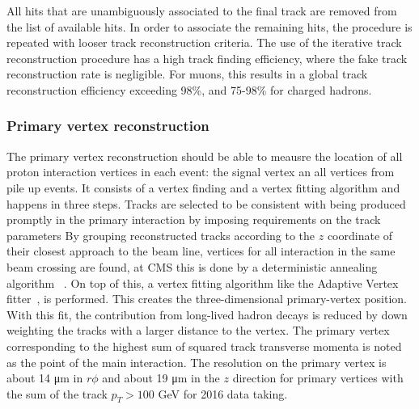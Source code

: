 All hits that are unambiguously associated to the final track are removed from the list of available hits. In order to associate the remaining hits, the procedure is repeated with looser track reconstruction criteria. The use of the iterative track reconstruction procedure has a high track finding efficiency, where the fake track reconstruction rate is negligible. 
For muons, this results in a global track reconstruction efficiency exceeding 98\%, and 75-98\% for charged hadrons. 
\subsubsection*{Primary vertex reconstruction}
The primary vertex reconstruction should be able to meausre the location of all proton interaction vertices in each event: the signal vertex an all vertices from pile up events. 
It consists of a vertex finding and a vertex fitting algorithm and happens in three steps. Tracks are selected  to be consistent with being produced promptly in the primary interaction by imposing requirements on the track parameters\cite{Chatrchyan:1704291} By grouping reconstructed tracks according to the $z$ coordinate of their closest approach to the beam line, vertices for all interaction in the same beam crossing are found, at CMS this is done by a deterministic annealing algorithm~\cite{726788} . On top of this, a vertex fitting algorithm like the Adaptive Vertex fitter~\cite{Waltenberger:1166320}, is performed. This creates the three-dimensional primary-vertex position. With this fit, the contribution from long-lived hadron decays is reduced by down weighting the tracks with a larger distance to the vertex. The primary vertex corresponding to the highest sum of squared track transverse momenta is noted as the point of the main interaction. The resolution on the primary vertex is about 14 \si{ \micro \meter} in $r\phi$ and about 19 \si{ \micro \meter} in the $z$ direction for primary vertices with the sum of the track $p_T > 100$ \si{ \GeV} for 2016 data taking.



